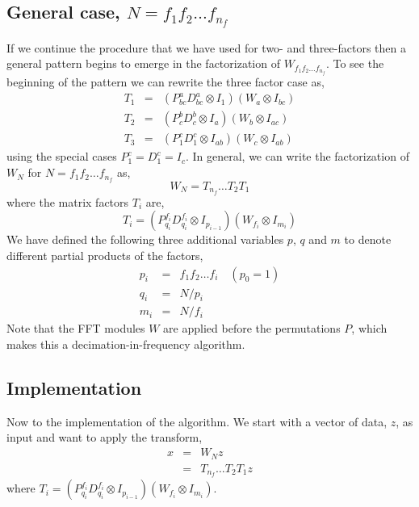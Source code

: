 \documentclass[fleqn,12pt]{article}
\begin{document}
\subsection{General case, $N=f_1 f_2 \dots f_{n_f}$}
%
If we continue the procedure that we have used for two- and
three-factors then a general pattern begins to emerge in the
factorization of $W_{f_1 f_2 \dots f_{n_f}}$. To see the beginning of
the pattern we can rewrite the three factor case as,
%
\begin{eqnarray}
T_1 &=& (P^a_{bc} D^a_{bc} \otimes I_1) (W_a \otimes I_{bc}) \\
T_2 &=& (P^b_c D^b_c \otimes I_a) (W_b \otimes I_{ac}) \\
T_3 &=& (P^c_1 D^c_1 \otimes I_{ab}) (W_c \otimes I_{ab} ) 
\end{eqnarray}
%
using the special cases $P^c_1 = D^c_1 = I_c$.
%
In general, we can write the factorization of $W_N$ for $N= f_1 f_2
\dots f_{n_f}$ as,
%       
\begin{equation}
W_N = T_{n_f} \dots T_2 T_1
\end{equation}
%
where the matrix factors $T_i$ are,
%
\begin{equation}
T_i = (P^{f_i}_{q_i} D^{f_i}_{q_i} \otimes I_{p_{i-1}}) ( W_{f_i}
\otimes I_{m_i})
\end{equation}
%
We have defined the following three additional variables $p$, $q$ and
$m$ to denote different partial products of the factors,
%
\begin{eqnarray}
p_i &=& f_1 f_2 \dots f_i \quad (p_0 = 1)  \\
q_i &=& N / p_i  \\
m_i &=& N / f_i 
\end{eqnarray}
%
Note that the FFT modules $W$ are applied before the permutations $P$,
which makes this a decimation-in-frequency algorithm.

\subsection{Implementation}
%
Now to the implementation of the algorithm. We start with a vector of
data, $z$, as input and want to apply the transform,
%
\begin{eqnarray}
x &=& W_N z \\
  &=& T_{n_f} \dots T_2 T_1 z
\end{eqnarray}
%
where $T_i = (P^{f_i}_{q_i} D^{f_i}_{q_i} \otimes I_{p_{i-1}}) (
W_{f_i} \otimes I_{m_i})$.
\end{document}
